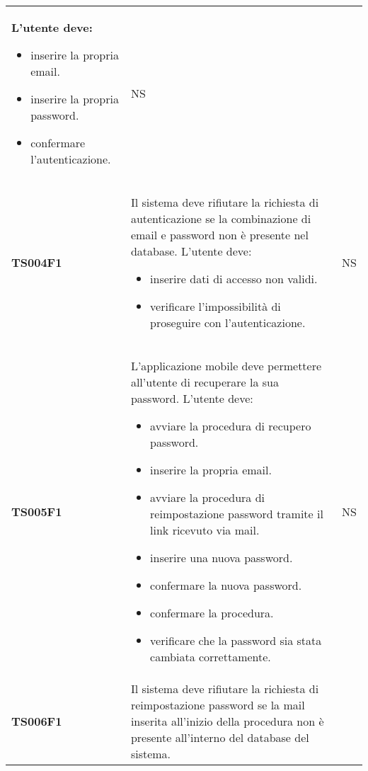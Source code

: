 \documentclass[../piano-di-qualifica.tex]{subfiles}
\begin{document}
\begin{centering}
\begin{longtable}[H]{>{\centering\bfseries}m{3cm} >{}p{10cm} >{\centering\arraybackslash}m{3cm}}
                        L'utente deve:
                        \begin{itemize}
                          \item inserire la propria email.
                          \item inserire la propria password.
                          \item confermare l'autenticazione.
                        \end{itemize}
                      & NS \\
        TS004F1      & Il sistema deve rifiutare la richiesta di autenticazione se la combinazione di email e password non è presente nel database. \newline
                        L'utente deve:
                        \begin{itemize}
                          \item inserire dati di accesso non validi.
                          \item verificare l'impossibilità di proseguire con l'autenticazione.
                        \end{itemize}
                      & NS \\
        TS005F1      & L'applicazione mobile deve permettere all'utente di recuperare la sua password. \newline
                        L'utente deve:
                        \begin{itemize}
                          \item avviare la procedura di recupero password.
                          \item inserire la propria email.
                          \item avviare la procedura di reimpostazione password tramite il link ricevuto via mail.
                          \item inserire una nuova password.
                          \item confermare la nuova password.
                          \item confermare la procedura.
                          \item verificare che la password sia stata cambiata correttamente.
                        \end{itemize}
                      & NS \\
        TS006F1    & Il sistema deve rifiutare la richiesta di reimpostazione password se la mail inserita all'inizio della procedura non è presente all'interno del database del sistema. \newline

\end{longtable}
\end{centering}
\end{document}
